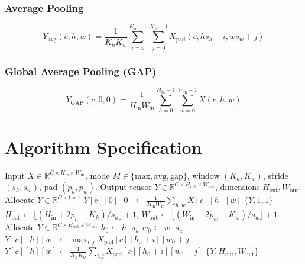 \documentclass[11pt,a4paper]{article}
\theoremstyle{definition}
\begin{document}
\subsubsection{Average Pooling}
\begin{equation}
Y_{\text{avg}}(c, h, w) = \frac{1}{K_h K_w} \sum_{i=0}^{K_h-1} \sum_{j=0}^{K_w-1} X_{\text{pad}}(c, h s_h + i, w s_w + j)
\end{equation}

\subsubsection{Global Average Pooling (GAP)}
\begin{equation}
Y_{\text{GAP}}(c, 0, 0) = \frac{1}{H_{\text{in}} W_{\text{in}}} \sum_{h=0}^{H_{\text{in}}-1} \sum_{w=0}^{W_{\text{in}}-1} X(c, h, w)
\end{equation}

\section{Algorithm Specification}

\begin{algorithm}[H]
\caption{Generic Pooling Layer Forward Pass}
\label{alg:pooling}
\begin{algorithmic}[1]
\Require Input $X \in \mathbb{R}^{C \times H_{\text{in}} \times W_{\text{in}}}$, mode $M \in \{\text{max}, \text{avg}, \text{gap}\}$, window $(K_h, K_w)$, stride $(s_h, s_w)$, pad $(p_h, p_w)$.
\Ensure Output tensor $Y \in \mathbb{R}^{C \times H_{\text{out}} \times W_{\text{out}}}$, dimensions $H_{\text{out}}, W_{\text{out}}$.
    \State Allocate $Y \in \mathbb{R}^{C \times 1 \times 1}$
        \State $Y[c][0][0] \gets \frac{1}{H_{\text{in}} W_{\text{in}}} \sum_{h, w} X[c][h][w]$
    \EndFor
    \State \Return $\{Y, 1, 1\}$
\EndIf
\State $H_{\text{out}} \gets \lfloor (H_{\text{in}} + 2p_h - K_h) / s_h \rfloor + 1$, $W_{\text{out}} \gets \lfloor (W_{\text{in}} + 2p_w - K_w) / s_w \rfloor + 1$
\State Allocate $Y \in \mathbb{R}^{C \times H_{\text{out}} \times W_{\text{out}}}$
        \State $h_0 \gets h \cdot s_h$
            \State $w_0 \gets w \cdot s_w$
                \State $Y[c][h][w] \gets \max_{i, j} X_{\text{pad}}[c][h_0 + i][w_0 + j]$
            \Else
                \State $Y[c][h][w] \gets \frac{1}{K_h K_w} \sum_{i, j} X_{\text{pad}}[c][h_0 + i][w_0 + j]$
            \EndIf
        \EndFor
    \EndFor
\EndFor
\State \Return $\{Y, H_{\text{out}}, W_{\text{out}}\}$
\end{algorithmic}
\end{algorithm}
\end{document}
